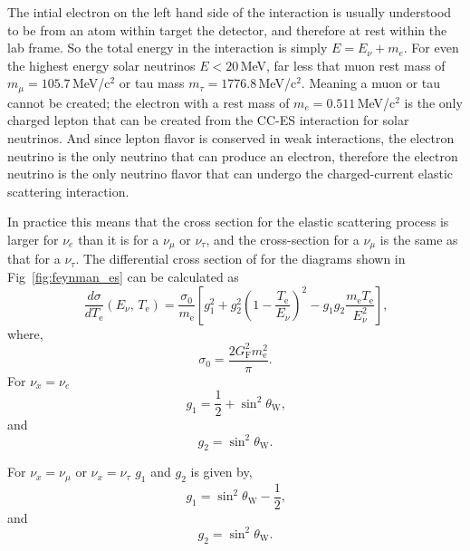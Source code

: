 The intial electron on the left hand side of the interaction is usually understood to
be from an atom within target the detector, and therefore at rest within
the lab frame.
So the total energy in the interaction is simply $E = E_{\nu} + m_{e}$.
For even the highest energy solar neutrinos $E<20$\,MeV, far less that muon
rest mass of $m_{\mu}=105.7$\,MeV/$\text{c}^{2}$ or tau mass $m_\tau = 1776.8$\,MeV/$\text{c}^{2}$.
Meaning a muon or tau cannot be created; the electron with a rest mass
of $m_{e}=0.511$\,MeV/$\text{c}^{2}$ is the only charged lepton that can
be created from the CC-ES interaction for solar neutrinos.
And since lepton flavor is conserved in weak interactions, the electron neutrino
is the only neutrino that can produce an electron, therefore the electron
neutrino is the only neutrino flavor that can undergo the charged-current
elastic scattering interaction.

In practice this means that the cross section for the elastic scattering process
is larger for $\nu_{e}$ than it is for a $\nu_\mu$ or $\nu_\tau$,
and the cross-section for a $\nu_\mu$ is the same as that for a $\nu_\tau$.
The differential cross section of for the diagrams shown in Fig~\ref{fig:feynman_es}
can be calculated as
\begin{equation}
    \frac{d\sigma}{dT_{\mathrm{e}}}\left(E_{\nu}\text{, }T_{\mathrm{e}}\right)=
    \frac{\sigma_{0}}{m_{\mathrm{e}}}\left[g_{1}^{2} + g_{2}^{2}\left(1 - \frac{T_{\mathrm{e}}}{E_{\nu}}\right)^{2} -g_{1}g_{2}\frac{m_{\mathrm{e}}T_{\mathrm{e}}}{E_{\nu}^{2}}\right]\text{,}
\end{equation}
where,
\begin{equation}
    \sigma_{0} = \frac{2G^{2}_{\mathrm{F}}m_{\mathrm{e}}^{2}}{\pi}\text{.}
\end{equation}
For $\nu_{x} = \nu_{e}$
\begin{equation}
    g_{1} = \frac{1}{2} + \sin^{2}\theta_{\mathrm{W}}\text{,}
\end{equation}
and
\begin{equation}
    g_{2} = \sin^{2}\theta_{\mathrm{W}}\text{.}
\end{equation}

For $\nu_{x} = \nu_{\mu}$ or $\nu_{x} = \nu_{\tau}$ $g_{1}$ and $g_{2}$ is
given by,
\begin{equation}
    g_{1} = \sin^{2}\theta_{\mathrm{W}} - \frac{1}{2}\text{,}
\end{equation}
and
\begin{equation}
    g_{2} = \sin^{2}\theta_{\mathrm{W}}\text{.}
\end{equation}

